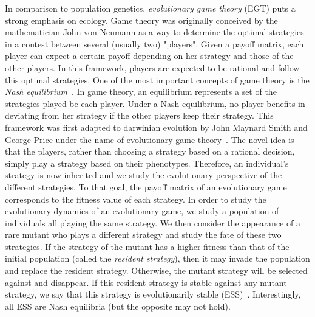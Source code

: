     In comparison to population genetics, \emph{evolutionary game theory} (EGT) puts a strong emphasis on ecology. Game theory was originally conceived by the mathematician John von Neumann as a way to determine the optimal strategies in a contest between several (usually two) "players". Given a payoff matrix, each player can expect a certain payoff depending on her strategy and those of the other players. In this framework, players are expected to be rational and follow this optimal strategies. One of the most important concepts of game theory is the \emph{Nash equilibrium}~\parencite{Nash1950}. In game theory, an equilibrium represents a set of the strategies played be each player. Under a Nash equilibrium, no player benefits in deviating from her strategy if the other players keep their strategy. This framework was first adapted to darwinian evolution by John Maynard Smith and George Price under the name of evolutionary game theory~\parencite{MaynardSmith1973}. The novel idea is that the players, rather than choosing a strategy based on a rational decision, simply play a strategy based on their phenotypes. Therefore, an individual's strategy is now inherited and we study the evolutionary perspective of the different strategies. To that goal, the payoff matrix of an evolutionary game corresponds to the fitness value of each strategy. In order to study the evolutionary dynamics of an evolutionary game, we study a population of individuals all playing the same strategy. We then consider the appearance of a rare mutant who plays a different strategy and study the fate of these two strategies. If the strategy of the mutant has a higher fitness than that of the initial population (called the \emph{resident strategy}), then it may invade the population and replace the resident strategy. Otherwise, the mutant strategy will be selected against and disappear. If this resident strategy is stable against any mutant strategy, we say that this strategy is evolutionarily stable (ESS)~\parencite{MaynardSmith1973}. Interestingly, all ESS are Nash equilibria (but the opposite may not hold).

